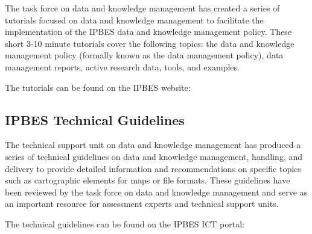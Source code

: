 \documentclass{article}
\begin{document}
The task force on data and knowledge management has created a series of tutorials focused on data and knowledge management to facilitate the implementation of the IPBES data and knowledge management policy. These short 3-10 minute tutorials cover the following topics: the data and knowledge management policy (formally known as the data management policy), data management reports, active research data, tools, and examples.

The tutorials can be found on the IPBES website:

\subsection{IPBES Technical Guidelines}

The technical support unit on data and knowledge management has produced a series of technical guidelines on data and knowledge management, handling, and delivery to provide detailed information and recommendations on specific topics such as cartographic elements for maps or file formats. These guidelines have been reviewed by the task force on data and knowledge management and serve as an important resource for assessment experts and technical support units.

The technical guidelines can be found on the IPBES ICT portal:
\end{document}
